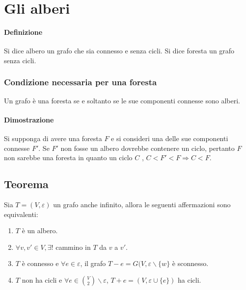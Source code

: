 \chapter{Gli alberi}
\subsubsection{Definizione}
Si dice albero un grafo che sia connesso e senza cicli. Si dice foresta un grafo senza cicli. 
\subsection{Condizione necessaria per una foresta}
Un grafo \`e una foresta se e soltanto se le sue componenti connesse sono alberi. 
\subsubsection{Dimostrazione}
Si supponga di avere una foresta $F$ e si consideri una delle sue componenti connesse $F'$. Se $F'$ non fosse un albero dovrebbe contenere un ciclo, pertanto $F$ non sarebbe 
una foresta in quanto un ciclo $C$ , $C<F'<F\Rightarrow C<F$.
\section{Teorema}
Sia $T=(V,\varepsilon)$ un grafo anche infinito, allora le seguenti affermazioni sono equivalenti:
\begin{enumerate}
\item $T$ \`e un albero.
\item $\forall v, v'\in V,\exists!$ cammino in $T$ da $v$ a $v'$.
\item $T$ \`e connesso e $\forall e\in\varepsilon$, il grafo $T-e=G(V, \varepsilon\backslash\{w\}$ \`e sconnesso. 
\item $T$ non ha cicli e $\forall e\in \binom{V}{2}\backslash\varepsilon$, $T+e=(V, \varepsilon\cup\{e\})$ ha cicli. 
\end{enumerate}